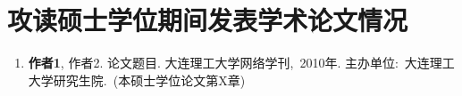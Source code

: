 ﻿%

%
%

\chapter*{\hfill 攻读硕士学位期间发表学术论文情况 \hfill}
\renewcommand{\labelenumi}{[\arabic{enumi}]}
\begin{enumerate}

\item {\song\bf 作者1}, 作者2. 论文题目. 大连理工大学网络学刊,~2010年.
主办单位:~大连理工大学研究生院.~(本硕士学位论文第X章)

\end{enumerate} 

